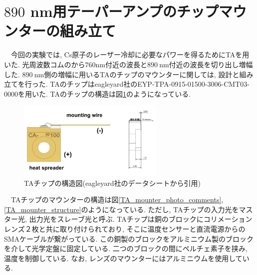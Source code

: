 \documentclass[uplatex, dvipdfmx, a4paper, report, papersize, 11pt]{jsbook}
\begin{document}
\section{$890$ nm用テーパーアンプのチップマウンターの組み立て}
　今回の実験では, Cs原子のレーザー冷却に必要なパワーを得るためにTAを用いた. 光周波数コムのから$760 \mathrm{nm}$付近の波長と$890\ \mathrm{nm}$付近の波長を切り出し増幅した. $890\ \mathrm{nm}$側の増幅に用いるTAのチップのマウンターに関しては, 設計と組み立てを行った. TAのチップはeagleyard社のEYP-TPA-0915-01500-3006-CMT03-0000を用いた. TAのチップの構造は図\ref{TA_chip_ds}のようになっている. \\
\begin{figure}[htbp]
 \begin{center}
  \includegraphics[width=70mm]{figures/chapter4/TA_chip_ds.png}
\end{center}
 \caption{TAチップの構造図(eagleyard社のデータシートから引用)}
 \label{TA_chip_ds}
\end{figure}
　TAチップのマウンターの構造は図\ref{TA_mounter_photo_comments}, \ref{TA_mounter_structure}のようになっている. ただし, TAチップの入力光をマスター光, 出力光をスレーブ光と呼ぶ. TAチップは銅のブロックにコリメーションレンズ２枚と共に取り付けられており, そこに温度センサーと直流電源からのSMAケーブルが繋がっている. この銅製のブロックをアルミニウム製のブロックを介して光学定盤に固定している. 二つのブロックの間にペルチェ素子を挟み, 温度を制御している. なお, レンズのマウンターにはアルミニウムを使用している.
\end{document}
